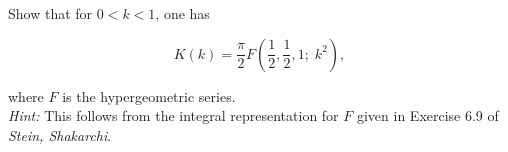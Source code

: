 Show that for $0 < k < 1$, one has

$$
K(k) = \frac{\pi}{2} F \left(\frac{1}{2}, \frac{1}{2}, 1; \; k^2 \right),
$$

where $F$ is the hypergeometric series. 
\ \\

\textit{Hint:} This follows from the integral representation for $F$ given in Exercise 6.9 of \textit{Stein, Shakarchi}.

\begin{solution}
  \ \\
\end{solution}